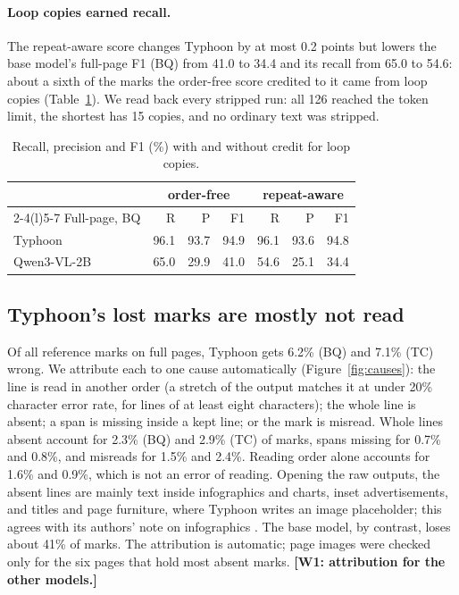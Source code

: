 \documentclass[10pt,twocolumn]{article}
\newcommand{\todo}[1]{\textcolor{red!70!black}{\textbf{[#1]}}}
\begin{document}
\paragraph{Loop copies earned recall.} The repeat-aware score changes Typhoon by at most 0.2 points but lowers the base model's full-page F1 (BQ) from 41.0 to 34.4 and its recall from 65.0 to 54.6: about a sixth of the marks the order-free score credited to it came from loop copies (Table~\ref{tab:repeat}). We read back every stripped run: all 126 reached the token limit, the shortest has 15 copies, and no ordinary text was stripped.

\begin{table}[t]
\centering\small
\begin{tabular}{@{}l rrr rrr@{}}
\toprule
 & \multicolumn{3}{c}{order-free} & \multicolumn{3}{c}{repeat-aware}\\
\cmidrule(lr){2-4}\cmidrule(l){5-7}
Full-page, BQ & R & P & F1 & R & P & F1\\
\midrule
Typhoon & 96.1 & 93.7 & 94.9 & 96.1 & 93.6 & 94.8\\
Qwen3-VL-2B & 65.0 & 29.9 & 41.0 & 54.6 & 25.1 & 34.4\\
\bottomrule
\end{tabular}
\caption{Recall, precision and F1 (\%) with and without credit for loop copies.}\label{tab:repeat}
\end{table}

\subsection{Typhoon's lost marks are mostly not read}
Of all reference marks on full pages, Typhoon gets 6.2\% (BQ) and 7.1\% (TC) wrong. We attribute each to one cause automatically (Figure~\ref{fig:causes}): the line is read in another order (a stretch of the output matches it at under 20\% character error rate, for lines of at least eight characters); the whole line is absent; a span is missing inside a kept line; or the mark is misread. Whole lines absent account for 2.3\% (BQ) and 2.9\% (TC) of marks, spans missing for 0.7\% and 0.8\%, and misreads for 1.5\% and 2.4\%. Reading order alone accounts for 1.6\% and 0.9\%, which is not an error of reading. Opening the raw outputs, the absent lines are mainly text inside infographics and charts, inset advertisements, and titles and page furniture, where Typhoon writes an image placeholder; this agrees with its authors' note on infographics \citep{nonesung2026typhoonocr}. The base model, by contrast, loses about 41\% of marks. The attribution is automatic; page images were checked only for the six pages that hold most absent marks. \todo{W1: attribution for the other models.}
\end{document}
